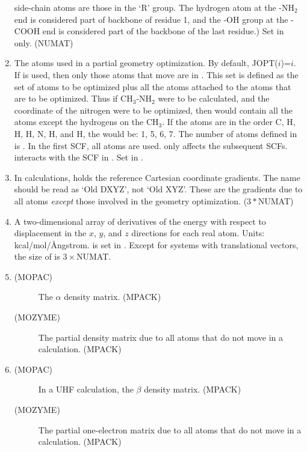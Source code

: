 \begin{enumerate}
side-chain atoms are those in the `R' group. The hydrogen atom at the -NH$_2$
end is considered part of backbone of residue 1, and the -OH group at the -COOH
end is considered part of the  backbone of the last residue.) Set in
 only. (NUMAT)
\item {} The atoms used in a partial geometry optimization.  By
default, JOPT($i$)=$i$.  If  is used, then only those atoms that
move are in .   This set is defined as the set of atoms to be
optimized plus all the atoms attached to the atoms that are to be optimized. 
Thus if CH$_3$-NH$_2$ were to be calculated, and the coordinate of the nitrogen
were to be  optimized, then  would contain all the atoms except the
hydrogens on the CH$_3$. If the atoms are in the order C, H, H, H, N, H, and H,
the  would be: 1, 5, 6, 7. The number of atoms defined in
 is . In the first SCF, all atoms are used. 
 only affects the subsequent SCFs.   interacts with the
SCF in . Set in .
\item {} In  calculations,  holds the
reference Cartesian coordinate gradients. The name should be read as `Old
DXYZ', not `Old XYZ'.   These are the gradients due to all  atoms {\em except}
those involved in the geometry optimization. ($3*$NUMAT)
\item {} A two-dimensional array of derivatives of the energy with
respect to displacement in the $x$, $y$, and $z$ directions for each real
atom.  Units: kcal/mol/\AA ngstrom.  is set in .
Except for systems with translational vectors, the size of  is
$3\times $NUMAT.
\item 
\begin{description}
\item[(MOPAC) ] The $\alpha$ density matrix. (MPACK)
\item[(MOZYME) ] The partial density matrix due to all atoms that
do not move in a  calculation. (MPACK)
\end{description}
\item
\begin{description}
\item[(MOPAC) ] In a UHF calculation, the $\beta$ density  matrix.
(MPACK)
\item[(MOZYME) ] The partial one-electron matrix due to all atoms
that do not move in a  calculation.  (MPACK)

\end{description}
\end{enumerate}
